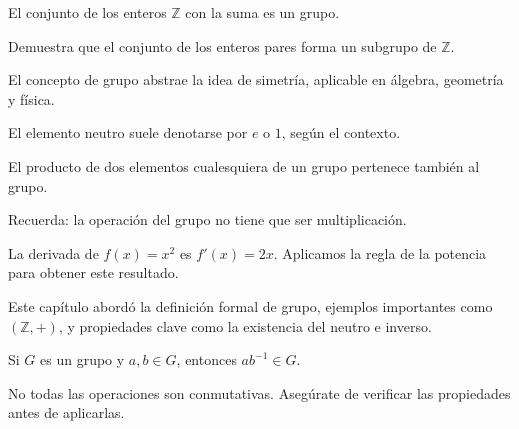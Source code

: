 \begin{example}
  El conjunto de los enteros \( \mathbb{Z} \) con la suma es un grupo.
\end{example}

\begin{exercise}
  Demuestra que el conjunto de los enteros pares forma un subgrupo de \( \mathbb{Z} \).
\end{exercise}

\begin{generality}
  El concepto de grupo abstrae la idea de simetría, aplicable en álgebra, geometría y física.
\end{generality}

\begin{note}
  El elemento neutro suele denotarse por \( e \) o \( 1 \), según el contexto.
\end{note}

\begin{property}[Clausura]
  El producto de dos elementos cualesquiera de un grupo pertenece también al grupo.
\end{property}

\begin{remark}
  Recuerda: la operación del grupo no tiene que ser multiplicación.
\end{remark}

\begin{solution}
  La derivada de \( f(x) = x^2 \) es \( f'(x) = 2x \).
  Aplicamos la regla de la potencia para obtener este resultado.
\end{solution}

\begin{summary}
  Este capítulo abordó la definición formal de grupo, ejemplos importantes como \((\mathbb{Z}, +)\), y propiedades clave como la existencia del neutro e inverso.
\end{summary}

\begin{theorem}
  Si \( G \) es un grupo y \( a, b \in G \), entonces \( ab^{-1} \in G \).
\end{theorem}

\begin{warnbox}
  No todas las operaciones son conmutativas. Asegúrate de verificar las propiedades antes de aplicarlas.
\end{warnbox}
    
